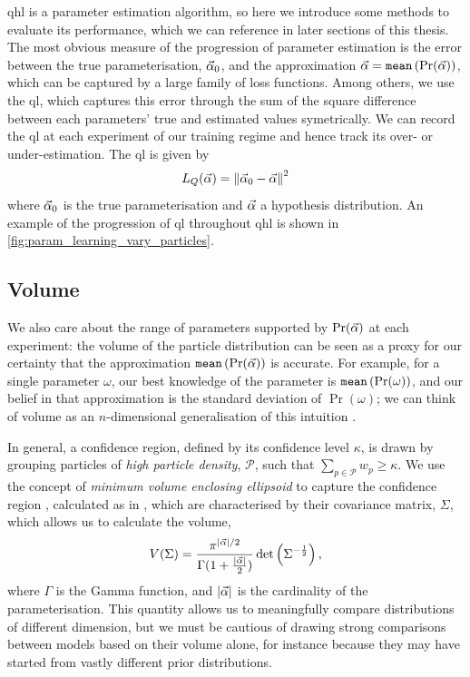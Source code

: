 \gls{qhl} is a parameter estimation algorithm, so here we introduce some methods to evaluate its performance, 
    which we can reference in later sections of this thesis. 
The most obvious measure of the progression of parameter estimation is the error between the true parameterisation, 
    $\vec{\alpha}_0$, and the approximation $\vec{\alpha} = \texttt{mean} \left( \Pr(\vec{\alpha}) \right)$,
    which can be captured by a large family of loss functions. 
Among others, we use the \gls{ql}, which captures this error through the sum of the square difference between 
    each parameters' true and estimated values symetrically.
We can record the \gls{ql} at each \gls{experiment} of our training regime and hence track its over- or under-estimation. 
The \gls{ql} is given by 
    \begin{equation}
        \label{eqn:quadratic_loss}
        L_{Q}(\vec{\alpha}) = \left\| \vec{\alpha}_0 - \vec{\alpha} \right\|^2
    \end{equation}
    where $\vec{\alpha}_0$ is the true parameterisation and $\vec{\alpha}$ a hypothesis distribution.
An example of the progression of \gls{ql} throughout \gls{qhl} is shown in \cref{fig:param_learning_vary_particles}.
\par 

\subsection{Volume}\label{sec:volume}
We also care about the range of parameters supported by $\Pr(\vec{\alpha})$ at each experiment: 
    the \gls{volume} of the \gls{particle} distribution can be seen as a proxy for our certainty
    that the approximation $\texttt{mean}\left(\Pr(\vec{\alpha})\right) $ is accurate. 
For example, for a single parameter $\omega$, our best knowledge of the parameter is $\texttt{mean}\left( \Pr(\omega) \right)$, 
    and our belief in that approximation is the standard deviation of $\Pr(\omega)$; 
    we can think of \gls{volume} as an $n$-dimensional generalisation of this intuition \cite{qinfer-1_0, ferrie2014high}. 
\par 
In general, a confidence region, defined by its confidence level $\kappa$, is drawn by grouping \glspl{particle} 
    of \emph{high \gls{particle} density}, $\mathcal{P}$, such that $\sum\limits_{p \in \mathcal{P}} w_{p} \geq \kappa$.
We use the concept of \emph{minimum volume enclosing ellipsoid}
    to capture the confidence region \cite{ferrie2014high}, calculated as in \cite{todd2007khachiyan}, 
    which are characterised by their covariance matrix, $\Sigma$, which allows us to calculate the \gls{volume}, 
    \begin{equation}
        \label{eqn:volume}
        V(\Sigma) = \frac{ \pi^{| \vec{\alpha} | / 2}}{ \Gamma(1 + \frac{| \vec{\alpha} |}{2})} \det\left(\Sigma^{-\frac{1}{2}}\right),
    \end{equation}
    where $\Gamma$ is the Gamma function, and $|\vec{\alpha}|$ is the cardinality of the parameterisation. 
This quantity allows us to meaningfully compare distributions of different dimension, 
    but we must be cautious of drawing strong comparisons between models based on 
    their \gls{volume} alone, for instance because they may have started from vastly different prior distributions. 
\par 

